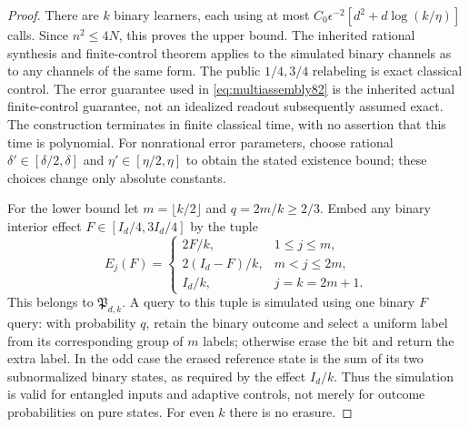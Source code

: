 \begin{proof}
There are $k$ binary learners, each using at most
$C_0\epsilon^{-2}[d^2+d\log(k/\eta)]$ calls.  Since $n^2\le4N$,
this proves the upper bound.  The inherited rational synthesis
and finite-control theorem applies to the simulated binary channels
as to any channels of the same form.  The public $1/4,3/4$ relabeling
is exact classical control.  The error guarantee used in
\eqref{eq:multiassembly82} is the inherited actual finite-control
guarantee, not an idealized readout subsequently assumed exact.
The construction terminates in finite classical time, with no
assertion that this time is polynomial.  For nonrational error
parameters, choose rational $\delta'\in[\delta/2,\delta]$ and
$\eta'\in[\eta/2,\eta]$ to obtain the stated existence bound;
these choices change only absolute constants.

For the lower bound let $m=\lfloor k/2\rfloor$ and $q=2m/k\ge2/3$.
Embed any binary interior effect $F\in[I_d/4,3I_d/4]$ by the tuple
\begin{equation}\label{eq:multiembedding82}
 E_j(F)=\begin{cases}
             2F/k,&1\le j\le m,\\
             2(I_d-F)/k,&m<j\le2m,\\
             I_d/k,&j=k=2m+1.
             \end{cases}
\end{equation}
This belongs to $\mathfrak P_{d,k}$.  A query to this tuple is
simulated using one binary $F$ query: with probability $q$, retain
the binary outcome and select a uniform label from its corresponding
group of $m$ labels; otherwise erase the bit and return the extra
label.  In the odd case the erased reference state is the sum of
its two subnormalized binary states, as required by the effect
$I_d/k$.  Thus the simulation is valid for entangled inputs and
adaptive controls, not merely for outcome probabilities on pure
states.  For even $k$ there is no erasure.


\end{proof}
